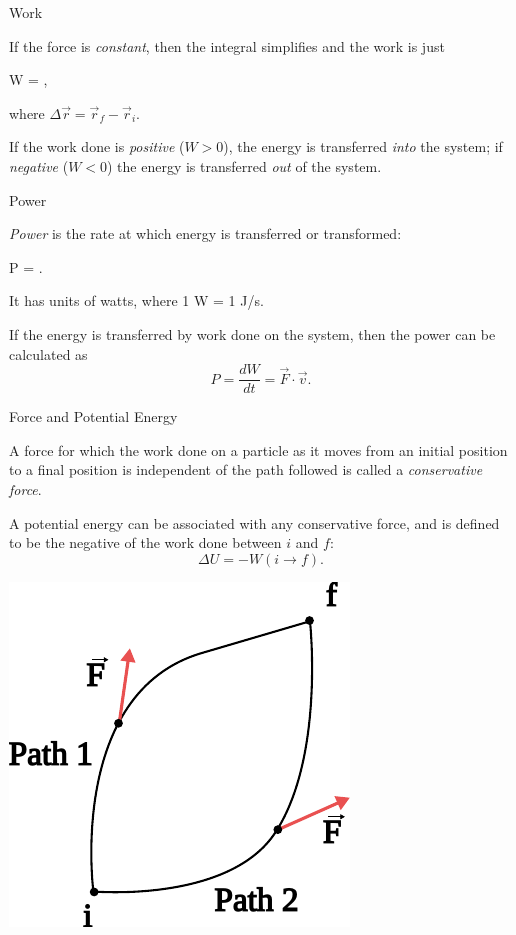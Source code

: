 \documentclass{summarysheet}
\begin{document}
\begin{multicols}{2}
\begin{topicbox}{Work}
\begin{multicols}{2}
\end{multicols}

If the force is \emph{constant}, then the integral simplifies and the work is just
\begin{eqbox}
W =  \cdot \Delta {},
\end{eqbox}
\noindent where  $\Delta \vec{r} = \vec{r}_f - \vec{r}_i$.

If the work done is \emph{positive} ($W>0$), the energy is transferred \emph{into} the system; if \emph{negative} ($W<0$) the energy is transferred \emph{out} of the system.


\end{topicbox}


\begin{topicbox}{Power}

\emph{Power} is the rate at which energy is transferred or transformed:
\begin{eqbox}
P = .
\end{eqbox}
\noindent It has units of watts, where 1 W = 1 J/s.

If the energy is transferred by work done on the system, then the power can be calculated as
\[
P = \frac{dW}{dt} = \vec{F} \cdot \vec{v}.
\]

\end{topicbox}




\begin{topicbox}{Force and Potential Energy}

\begin{multicols}{2}

\noindent A force for which the work done on a particle as it moves from an initial position to a final position is independent of the path followed is called a \emph{conservative force}.

A potential energy can be associated with any conservative force, and is defined to be the negative of the work done between $i$ and $f$:
\[
\Delta U = -W(i \to f).
\]
\begin{center}
\includegraphics[scale=0.5]{fig_path2.pdf}
\end{center}



\end{multicols}
\end{topicbox}
\end{multicols}
\end{document}
